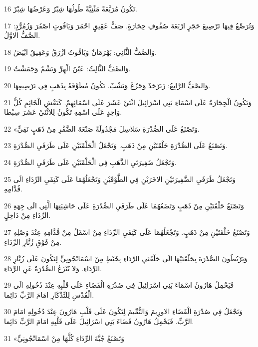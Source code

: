 \par 16 تَكُونُ مُرَبَّعَةً مَثْنِيَّةً طُولُهَا شِبْرٌ وَعَرْضُهَا شِبْرٌ.
\par 17 وَتُرَصِّعُ فِيهَا تَرْصِيعَ حَجَرٍ ارْبَعَةَ صُفُوفِ حِجَارَةٍ. صَفُّ عَقِيقٍ احْمَرَ وَيَاقُوتٍ اصْفَرَ وَزُمُرُّدٍ: الصَّفُّ الاوَّلُ.
\par 18 وَالصَّفُّ الثَّانِي: بَهْرَمَانٌ وَيَاقُوتٌ ازْرَقُ وَعَقِيقٌ ابْيَضُ.
\par 19 وَالصَّفُّ الثَّالِثُ: عَيْنُ الْهِرِّ وَيَشْمٌ وَجَمَشْتٌ.
\par 20 وَالصَّفُّ الرَّابِعُ: زَبَرْجَدٌ وَجَزْعٌ وَيَشْبٌ. تَكُونُ مُطَوَّقَةً بِذَهَبٍ فِي تَرْصِيعِهَا.
\par 21 وَتَكُونُ الْحِجَارَةُ عَلَى اسْمَاءِ بَنِي اسْرَائِيلَ اثْنَيْ عَشَرَ عَلَى اسْمَائِهِمْ. كَنَقْشِ الْخَاتَِمِ كُلُّ وَاحِدٍ عَلَى اسْمِهِ تَكُونُ لِلاثْنَيْ عَشَرَ سِبْطا.
\par 22 «وَتَصْنَعُ عَلَى الصُّدْرَةِ سَلاسِلَ مَجْدُولَةً صَنْعَةَ الضَّفْرِ مِنْ ذَهَبٍ نَقِيٍّ.
\par 23 وَتَصْنَعُ عَلَى الصُّدْرَةِ حَلْقَتَيْنِ مِنْ ذَهَبٍ. وَتَجْعَلُ الْحَلْقَتَيْنِ عَلَى طَرَفَيِ الصُّدْرَةِ.
\par 24 وَتَجْعَلُ ضَفِيرَتَيِ الذَّهَبِ فِي الْحَلْقَتَيْنِ عَلَى طَرَفَيِ الصُّدْرَةِ.
\par 25 وَتَجْعَلُ طَرَفَيِ الضَّفِيرَتَيْنِ الاخَرَيْنِ فِي الطَّوْقَيْنِ وَتَجْعَلُهُمَا عَلَى كَتِفَيِ الرِّدَاءِ الَى قُدَّامِهِ.
\par 26 وَتَصْنَعُ حَلْقَتَيْنِ مِنْ ذَهَبٍ وَتَضَعُهُمَا عَلَى طَرَفَيِ الصُّدْرَةِ عَلَى حَاشِيَتِهَا الَّتِي الَى جِهَةِ الرِّدَاءِ مِنْ دَاخِلٍ.
\par 27 وَتَصْنَعُ حَلْقَتَيْنِ مِنْ ذَهَبٍ. وَتَجْعَلُهُمَا عَلَى كَتِفَيِ الرِّدَاءِ مِنْ اسْفَلُ مِنْ قُدَّامِهِ عِنْدَ وَصْلِهِ مِنْ فَوْقِ زُنَّارِ الرِّدَاءِ.
\par 28 وَيَرْبُطُونَ الصُّدْرَةَ بِحَلْقَتَيْهَا الَى حَلْقَتَيِ الرِّدَاءِ بِخَيْطٍ مِنْ اسْمَانْجُونِيٍّ لِتَكُونَ عَلَى زُنَّارِ الرِّدَاءِ. وَلا تُنْزَعُ الصُّدْرَةُ عَنِ الرِّدَاءِ.
\par 29 فَيَحْمِلُ هَارُونُ اسْمَاءَ بَنِي اسْرَائِيلَ فِي صُدْرَةِ الْقَضَاءِ عَلَى قَلْبِهِ عِنْدَ دُخُولِهِ الَى الْقُدْسِ لِلتِّذْكَارِ امَامَ الرَّبِّ دَائِما.
\par 30 وَتَجْعَلُ فِي صُدْرَةِ الْقَضَاءِ الاورِيمَ وَالتُّمِّيمَ لِتَكُونَ عَلَى قَلْبِ هَارُونَ عِنْدَ دُخُولِهِ امَامَ الرَّبِّ. فَيَحْمِلُ هَارُونُ قَضَاءَ بَنِي اسْرَائِيلَ عَلَى قَلْبِهِ امَامَ الرَّبِّ دَائِما.
\par 31 «وَتَصْنَعُ جُبَّةَ الرِّدَاءِ كُلَّهَا مِنْ اسْمَانْجُونِيٍّ
